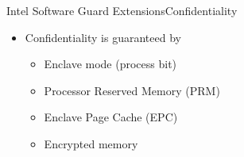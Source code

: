 \documentclass{beamer}
\begin{document}
\begin{frame}{Intel Software Guard Extensions}{Confidentiality}
    \begin{itemize}
    	\item Confidentiality is guaranteed by

			\vfill

    	\begin{itemize}
    		\item Enclave mode (process bit)

  			\vfill

    		\item Processor Reserved Memory (PRM)

  			\vfill

    		\item Enclave Page Cache (EPC)

  			\vfill

    		\item Encrypted memory
    	\end{itemize}
    \end{itemize}
\end{frame}


\end{document}
